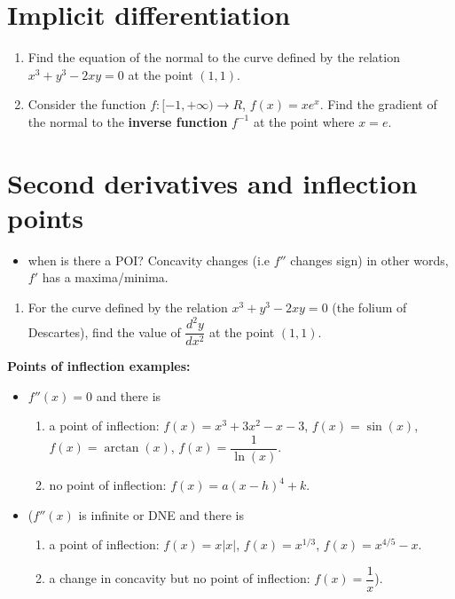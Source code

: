 \documentclass[12pt]{article}
\begin{document}
\vspace{2cm}

\section*{Implicit differentiation}

\begin{enumerate}
    \item Find the equation of the normal to the curve defined by the relation $x^3 + y^3 - 2xy = 0$ at the point $(1, 1)$.
    
    \vspace{2cm}
    
    \item Consider the function $f : [-1, +\infty) \rightarrow R$, $f(x) = xe^x$. Find the gradient of the normal to the \textbf{inverse function} $f^{-1}$ at the point where $x = e$.
\end{enumerate}

\vspace{2cm}

\section*{Second derivatives and inflection points}
\begin{itemize}
    \item when is there a POI? Concavity changes (i.e $f''$ changes sign) in other words, $f'$ has a maxima/minima.

\end{itemize}
\begin{enumerate}
    \item For the curve defined by the relation $x^3 + y^3 - 2xy = 0$ (the folium of Descartes), find the value of $\dfrac{d^2 y}{dx^2}$ at the point $(1, 1)$.
\end{enumerate}

\hfill

\noindent \textbf{Points of inflection examples:}


\begin{itemize}
    \item $f''(x) = 0$ and there is
    \begin{enumerate}[1.]
        \item a point of inflection: $f(x) = x^3 + 3x^2 - x - 3$, $f(x) = \sin(x)$, $f(x) = \arctan(x)$, $f(x) = \dfrac{1}{\ln(x)}$.
        \item no point of inflection: $f(x) = a(x-h)^4 + k$.
    \end{enumerate}
    
    \item ($f''(x)$ is infinite or DNE and there is
    \begin{enumerate}[1.]
        \item a point of inflection: $f(x) = x|x|$, $f(x) = x^{1/3}$, $f(x) = x^{4/5} - x$.
        \item a change in concavity but no point of inflection: $f(x) = \dfrac{1}{x}$).
    \end{enumerate}
\end{itemize}
\end{document}
